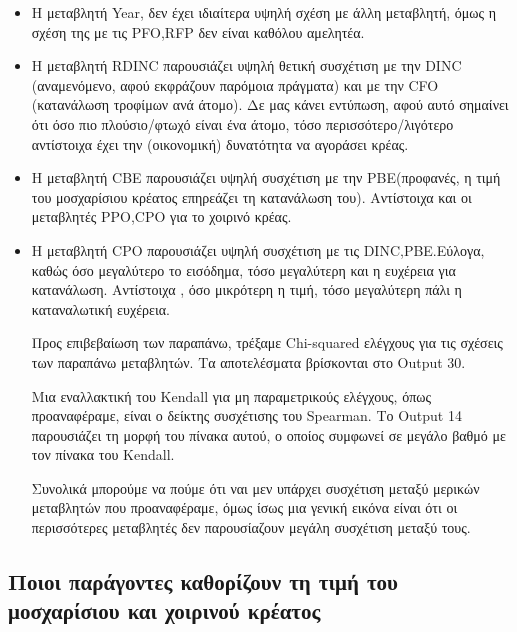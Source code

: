 \documentclass[10pt]{article}
\begin{document}
\begin{itemize}
    \item Η μεταβλητή Year, δεν έχει ιδιαίτερα υψηλή σχέση με άλλη μεταβλητή, όμως η σχέση της με τις PFO,RFP δεν είναι καθόλου αμελητέα.
    \item Η μεταβλητή RDINC παρουσιάζει υψηλή θετική συσχέτιση με την DINC (αναμενόμενο, αφού εκφράζουν παρόμοια πράγματα) και με την CFO \newline (κατανάλωση τροφίμων ανά άτομο). Δε μας κάνει εντύπωση, αφού αυτό σημαίνει ότι όσο πιο πλούσιο/φτωχό είναι ένα άτομο, τόσο περισσότερο/λιγότερο αντίστοιχα έχει την (οικονομική) δυνατότητα να αγοράσει κρέας.
    \item Η μεταβλητή CBE παρουσιάζει υψηλή συσχέτιση με την PBE(προφανές, η τιμή του μοσχαρίσιου κρέατος επηρεάζει τη κατανάλωση του). Αντίστοιχα και οι μεταβλητές PPO,CPO για το χοιρινό κρέας.
    \item Η μεταβλητή CPO παρουσιάζει υψηλή συσχέτιση με τις DINC,PBE.Εύλογα, καθώς όσο μεγαλύτερο το εισόδημα, τόσο μεγαλύτερη και η ευχέρεια για κατανάλωση. Αντίστοιχα , όσο μικρότερη η τιμή, τόσο μεγαλύτερη πάλι η καταναλωτική ευχέρεια.
    
    Προς επιβεβαίωση των παραπάνω, τρέξαμε Chi-squared ελέγχους για τις σχέσεις των παραπάνω μεταβλητών. Τα αποτελέσματα βρίσκονται στο Output 30.
    
    Μια εναλλακτική του Kendall για μη παραμετρικούς ελέγχους, όπως \newline προαναφέραμε, είναι ο δείκτης συσχέτισης του Spearman. Το Output 14 παρουσιάζει τη μορφή του πίνακα αυτού, ο οποίος συμφωνεί σε μεγάλο βαθμό με τον πίνακα του Kendall.
    
    Συνολικά μπορούμε να πούμε ότι ναι μεν υπάρχει συσχέτιση μεταξύ μερικών μεταβλητών που προαναφέραμε, όμως ίσως μια γενική εικόνα είναι ότι οι περισσότερες μεταβλητές δεν παρουσίαζουν μεγάλη συσχέτιση μεταξύ τους.

\end{itemize}

\subsection {Ποιοι παράγοντες καθορίζουν τη τιμή του μοσχαρίσιου και χοιρινού κρέατος}

 \

\
\end{document}
